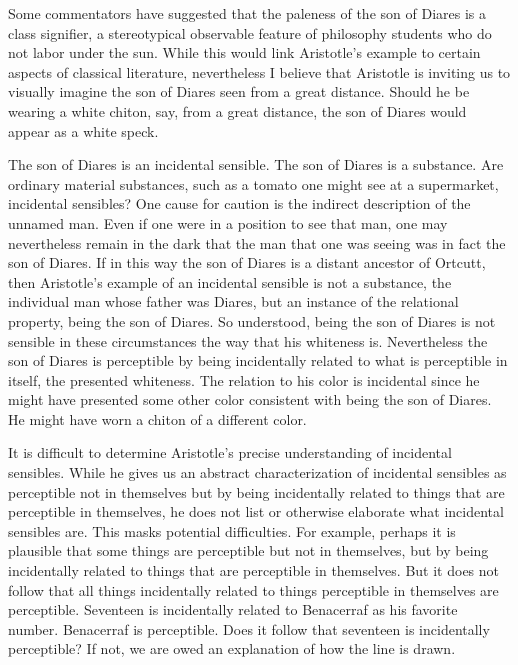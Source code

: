 Some commentators have suggested that the paleness of the son of Diares is a class signifier, a stereotypical observable feature of philosophy students who do not labor under the sun. While this would link Aristotle's example to certain aspects of classical literature, nevertheless I believe that Aristotle is inviting us to visually imagine the son of Diares seen from a great distance. Should he be wearing a white chiton, say, from a great distance, the son of Diares would appear as a white speck. 

The son of Diares is an incidental sensible. The son of Diares is a substance. Are ordinary material substances, such as a tomato one might see at a supermarket, incidental sensibles? One cause for caution is the indirect description of the unnamed man. Even if one were in a position to see that man, one may nevertheless remain in the dark that the man that one was seeing was in fact the son of Diares. If in this way the son of Diares is a distant ancestor of Ortcutt, then Aristotle's example of an incidental sensible is not a substance, the individual man whose father was Diares, but an instance of the relational property, being the son of Diares. So understood, being the son of Diares is not sensible in these circumstances the way that his whiteness is. Nevertheless the son of Diares is perceptible by being incidentally related to what is perceptible in itself, the presented whiteness. The relation to his color is incidental since he might have presented some other color consistent with being the son of Diares. He might have worn a chiton of a different color.

It is difficult to determine Aristotle's precise understanding of incidental sensibles. While he gives us an abstract characterization of incidental sensibles as perceptible not in themselves but by being incidentally related to things that are perceptible in themselves, he does not list or otherwise elaborate what incidental sensibles are. This masks potential difficulties. For example, perhaps it is plausible that some things are perceptible but not in themselves, but by being incidentally related to things that are perceptible in themselves. But it does not follow that all things incidentally related to things perceptible in themselves are perceptible. Seventeen is incidentally related to Benacerraf as his favorite number. Benacerraf is perceptible. Does it follow that seventeen is incidentally perceptible? If not, we are owed an explanation of how the line is drawn.

